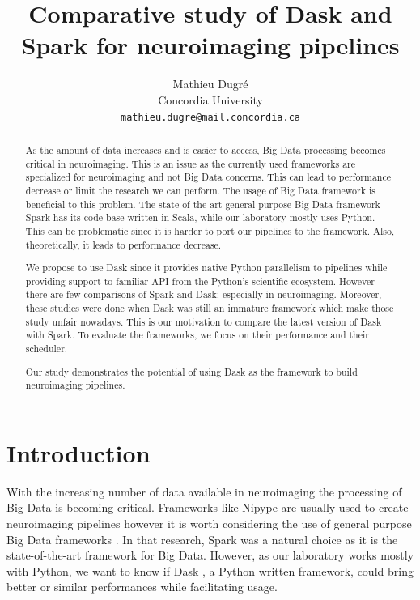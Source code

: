 \documentclass[11pt,a4paper]{article}
\title{Comparative study of Dask and Spark for neuroimaging pipelines}
\author{Mathieu Dugr{\'e} \\
  Concordia University \\
  \texttt{mathieu.dugre@mail.concordia.ca}\\}
\date{}
\begin{document}
\maketitle
\begin{abstract}

As the amount of data increases and is easier to access, Big Data processing becomes critical in neuroimaging. 
This is an issue as the currently used frameworks are specialized for neuroimaging and not Big Data concerns. This can lead to performance decrease or limit the research we can perform.
The usage of Big Data framework is beneficial to this problem.
The state-of-the-art general purpose Big Data framework Spark has its code base written in Scala, while our laboratory mostly uses Python. This can be problematic since it is harder to port our pipelines to the framework. Also, theoretically, it leads to performance decrease.

We propose to use Dask since it provides native Python parallelism to pipelines while providing support to familiar API from the Python's scientific ecosystem. However there are few comparisons of Spark and Dask; especially in neuroimaging. Moreover, these studies were done when Dask was still an immature framework which make those study unfair nowadays. This is our motivation to compare the latest version of Dask with Spark.
To evaluate the frameworks, we focus on their performance and their scheduler.

Our study demonstrates the potential of using Dask as the framework to build neuroimaging pipelines.

\end{abstract}

\section{Introduction}
With the increasing number of data available in neuroimaging \citep{ALFAROALMAGRO:18, UKBioBank:18} the processing of Big Data is becoming critical. Frameworks like Nipype \citep{Nipype:11} are usually used to create neuroimaging pipelines however it is worth considering the use of general purpose Big Data frameworks \citep{Hayot-Sasson:17}. In that research, Spark \citep{Spark:16} was a natural choice as it is the state-of-the-art framework for Big Data. However, as our laboratory works mostly with Python, we want to know if Dask \citep{Dask:15}, a Python written framework, could bring better or similar performances while facilitating usage.
\end{document}
